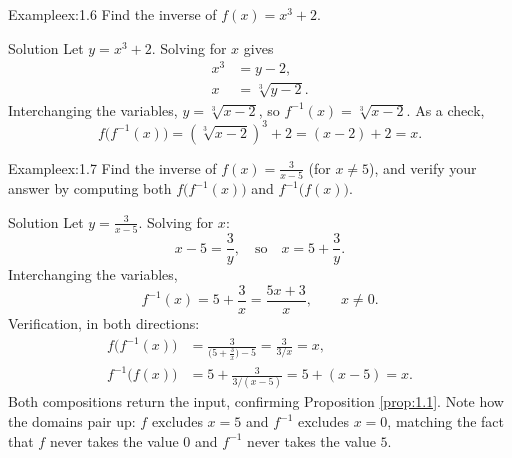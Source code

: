\documentclass[a4paper,12pt,oneside]{memoir}
\begin{document}
\begin{workedexample}
\begin{envexample}{Example}{ex:1.6}{}
Find the inverse of \(f(x) = x^{3} + 2\).
\end{envexample}
\begin{envsolution}{Solution}{}{}
Let \(y = x^{3} + 2\). Solving for \(x\) gives \[ \begin{aligned} x^{3} &= y - 2,\\ x &= \sqrt[3]{y - 2}. \end{aligned} \] Interchanging the variables, \(y = \sqrt[3]{x - 2}\), so \(f^{-1}(x) = \sqrt[3]{x - 2}\). As a check, \[ f\!\bigl(f^{-1}(x)\bigr) = \left(\sqrt[3]{x - 2}\right)^{3} + 2 = (x - 2) + 2 = x. \]
\end{envsolution}
\end{workedexample}
\begin{workedexample}
\begin{envexample}{Example}{ex:1.7}{}
Find the inverse of \(f(x) = \frac{3}{x - 5}\) (for \(x \neq 5\)), and verify your answer by computing both \(f\!\bigl(f^{-1}(x)\bigr)\) and \(f^{-1}\!\bigl(f(x)\bigr)\).
\end{envexample}
\begin{envsolution}{Solution}{}{}
Let \(y = \frac{3}{x - 5}\). Solving for \(x\): \[ x - 5 = \frac{3}{y}, \quad\text{so}\quad x = 5 + \frac{3}{y}. \] Interchanging the variables, \[ f^{-1}(x) = 5 + \frac{3}{x} = \frac{5x + 3}{x}, \qquad x \neq 0. \] Verification, in both directions: \[ \begin{aligned} f\!\bigl(f^{-1}(x)\bigr) &= \frac{3}{\bigl(5 + \tfrac{3}{x}\bigr) - 5} = \frac{3}{3/x} = x, \\ f^{-1}\!\bigl(f(x)\bigr) &= 5 + \frac{3}{3/(x - 5)} = 5 + (x - 5) = x. \end{aligned} \] Both compositions return the input, confirming Proposition \ref{prop:1.1}. Note how the domains pair up: \(f\) excludes \(x = 5\) and \(f^{-1}\) excludes \(x = 0\), matching the fact that \(f\) never takes the value \(0\) and \(f^{-1}\) never takes the value \(5\).
\end{envsolution}
\end{workedexample}
\end{document}
